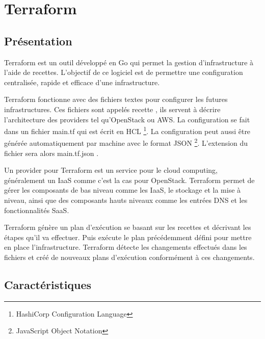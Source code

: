 \documentclass[]{article}
\begin{document}
\newpage
\section{Terraform}\label{terraform}

\subsection{Présentation}\label{pruxe9senation}

Terraform est un outil développé en Go qui permet la gestion
d'infrastructure à l'aide de recettes. L'objectif de ce logiciel est de
permettre une configuration centralisée, rapide et efficace d'une
infrastructure.

Terraform fonctionne avec des fichiers textes pour configurer les futures
infrastructures. Ces fichiers sont appelés \og recette
\fg , ils servent à décrire l'architecture des providers tel
qu'OpenStack ou AWS. La configuration se fait dans un fichier
\og main.tf \fg qui est écrit en HCL \footnote{HashiCorp Configuration Language}. La configuration peut aussi être
générée automatiquement par machine avec le format JSON \footnote{JavaScript Object Notation}.
L'extension du fichier sera alors \og main.tf.json
\fg.

Un provider pour Terraform est un service pour le cloud computing, généralement un
IaaS comme c'est la cas pour OpenStack. 
Terraform permet de gérer les composants de bas niveau comme les IaaS,
le stockage et la mise à niveau, ainsi que des composants hauts niveaux
comme les entrées DNS et les fonctionnalités SaaS.

Terraform génère un plan d'exécution se basant sur les recettes et
décrivant les étapes qu'il va effectuer. Puis exécute le plan
précédemment défini pour mettre en place l'infrastructure. Terraform
détecte les changements effectués dans les fichiers et créé de nouveaux
plans d'exécution conformément à ces changements.

\subsection{Caractéristiques}\label{caractuxe9ristiques}
\end{document}
